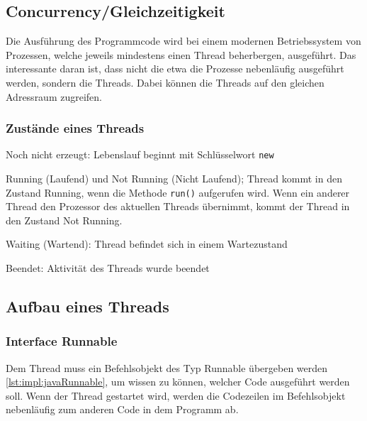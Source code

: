 \subsection{Concurrency/Gleichzeitigkeit}
Die Ausführung des Programmcode wird bei einem modernen Betriebssystem von Prozessen, welche jeweils mindestens einen Thread beherbergen, ausgeführt. Das interessante daran ist, dass nicht die etwa die Prozesse nebenläufig ausgeführt werden, sondern die Threads. Dabei können die Threads auf den gleichen Adressraum zugreifen.

\subsubsection{Zustände eines Threads}
\begin{compactitem}
    \item Noch nicht erzeugt: Lebenslauf beginnt mit Schlüsselwort \texttt{new}
    \item Running (Laufend) und Not Running (Nicht Laufend); Thread kommt in den Zustand Running, wenn die Methode \texttt{run()} aufgerufen wird. Wenn ein anderer Thread den Prozessor des aktuellen Threads übernimmt, kommt der Thread in den Zustand Not Running.     
    \item Waiting (Wartend): Thread befindet sich in einem Wartezustand 
    \item Beendet: Aktivität des Threads wurde beendet
\end{compactitem}

\subsection{Aufbau eines Threads}
\subsubsection{Interface Runnable}
Dem Thread muss ein Befehlsobjekt des Typ Runnable übergeben werden \ref{lst:impl:javaRunnable}, um wissen zu können, welcher Code ausgeführt werden soll. 
Wenn der Thread gestartet wird, werden die Codezeilen im Befehlsobjekt nebenläufig zum anderen Code in dem Programm ab.

